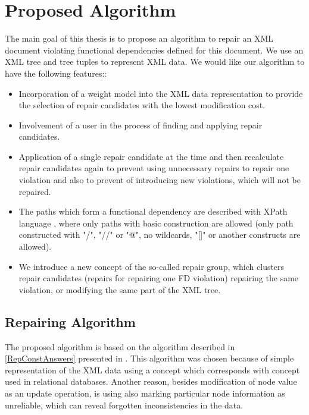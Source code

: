 \chapter{Proposed Algorithm}\label{kap4}

The main goal of this thesis is to propose an algorithm to repair an XML document violating functional dependencies defined for this document. We use an XML tree and tree tuples to represent XML data. We would like our algorithm to have the following features::

\begin{itemize}
	\item Incorporation of a weight model into the XML data representation to provide the selection of repair candidates with the lowest modification cost.
    \item Involvement of a user in the process of finding and applying repair candidates.
    \item Application of a single repair candidate at the time and then recalculate repair candidates again to prevent using unnecessary repairs to repair one violation and also to prevent of introducing new violations, which will not be repaired.
    \item The paths which form a functional dependency are described with XPath language \cite{xpath}, where only paths with basic construction are allowed (only path constructed with "/", "//" or "@", no wildcards, "[]" or another constructs are allowed).
    \item We introduce a new concept of the so-called repair group, which clusters repair candidates (repairs for repairing one FD violation) repairing the same violation, or modifying the same part of the XML tree.
\end{itemize}


\section{Repairing Algorithm}

The proposed algorithm is based on the algorithm described in \ref{RepConstAnswers} presented in \cite{RepAndConsistentAnswer}. This algorithm was chosen because of simple representation of the XML data using a concept which corresponds with concept used in relational databases. Another reason, besides modification of node value as an update operation, is using also marking particular node information as unreliable, which can reveal forgotten inconsistencies in the data.

